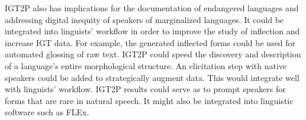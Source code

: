 IGT2P also has implications for the documentation of endangered languages and addressing digital inequity of speakers of marginalized languages. It could be integrated into linguists’ workflow in order to improve the study of inflection and increase IGT data. For example, the generated inflected forms could be used for automated glossing of raw text. IGT2P could speed the discovery and description of a language's entire morphological structure. An elicitation step with native speakers could be added to strategically augment data. This would integrate well with linguists’ workflow. IGT2P results could serve as to prompt speakers for forms that are rare in natural speech. It might also be integrated into linguistic software such as FLEx. 
